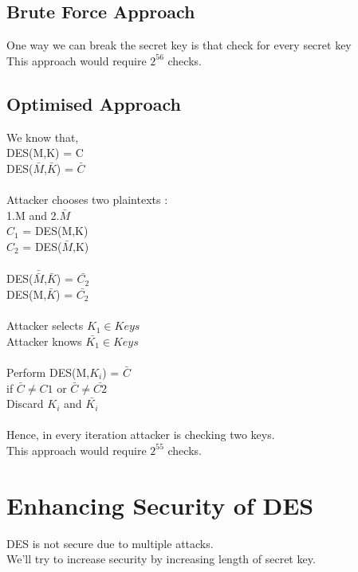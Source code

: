 \documentclass[11pt]{article}
\begin{document}
\subsection*{Brute Force Approach}
One way we can break the secret key is that check for every secret key \\
This approach would require $2^{56}$ checks. 

\subsection*{Optimised Approach}
We know that, \\
DES(M,K) = C \\
DES($\bar{M}$,$\bar{K}$) = $\bar{C}$ \\ \\
Attacker chooses two plaintexts : \\
1.M and 2.$\bar{M}$ \\
$C_{1}$ = DES(M,K) \\
$C_{2}$ = DES($\bar{M}$,K) \\ \\
DES($\bar{\bar{M}}$,$\bar{K}$) = $\bar{C_{2}}$ \\
DES(M,$\bar{K}$) = $\bar{C_{2}}$ \\ \\
Attacker selects $K_{1} \in Keys$ \\
Attacker knows $\bar{K_{1}} \in Keys$ \\ \\
Perform DES(M,$K_{i}$) = $\bar{C}$ \\
if $\bar{C} \neq C{1}$ or $\bar{C} \neq \bar{C{2}}$ \\
Discard $K_{i}$ and $\bar{K_{i}}$ \\ \\
Hence, in every iteration attacker is checking two keys. \\
This approach would require $2^{55}$ checks.\\

\section*{Enhancing Security of DES}
DES is not secure due to multiple attacks. \\
We'll try to increase security by increasing length of secret key. \\
\end{document}

